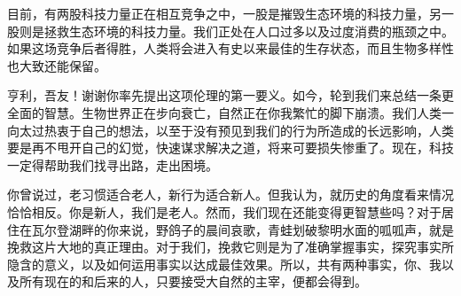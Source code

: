 { 目前，有两股科技力量正在相互竞争之中，一股是摧毁生态环境的科技力量，另一股则是拯救生态环境的科技力量。我们正处在人口过多以及过度消费的瓶颈之中。如果这场竞争后者得胜，人类将会进入有史以来最佳的生存状态，而且生物多样性也大致还能保留。
 
 亨利，吾友！谢谢你率先提出这项伦理的第一要义。如今，轮到我们来总结一条更全面的智慧。生物世界正在步向衰亡，自然正在你我繁忙的脚下崩溃。我们人类一向太过热衷于自己的想法，以至于没有预见到我们的行为所造成的长远影响，人类要是再不甩开自己的幻觉，快速谋求解决之道，将来可要损失惨重了。现在，科技一定得帮助我们找寻出路，走出困境。
 
 你曾说过，老习惯适合老人，新行为适合新人。但我认为，就历史的角度看来情况恰恰相反。你是新人，我们是老人。然而，我们现在还能变得更智慧些吗？对于居住在瓦尔登湖畔的你来说，野鸽子的晨间哀歌，青蛙划破黎明水面的呱呱声，就是挽救这片大地的真正理由。对于我们，挽救它则是为了准确掌握事实，探究事实所隐含的意义，以及如何运用事实以达成最佳效果。所以，共有两种事实，你、我以及所有现在的和后来的人，只要接受大自然的主宰，便都会得到。}